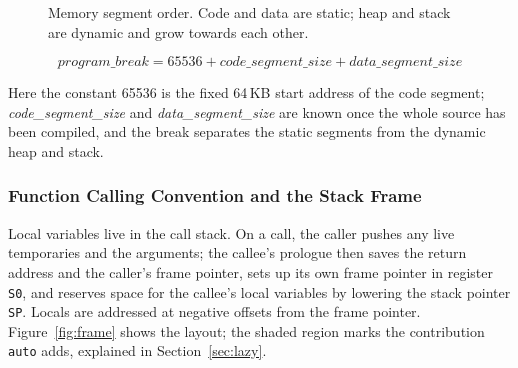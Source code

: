 \documentclass[a4paper,11pt]{article}
\begin{document}
\begin{figure}[H]
\centering
{}
\caption{Memory segment order. Code and data are static; heap and stack are dynamic and grow towards each other.}
\label{fig:memory}
\end{figure}

\begin{equation}
\textit{program\_break} = 65536 + \textit{code\_segment\_size} + \textit{data\_segment\_size}
\label{eq:break}
\end{equation}

\noindent Here the constant 65536 is the fixed 64\,KB start address of the code segment; \textit{code\_segment\_size} and \textit{data\_segment\_size} are known once the whole source has been compiled, and the break separates the static segments from the dynamic heap and stack.

\subsubsection{Function Calling Convention and the Stack Frame}
\label{sec:frame}

Local variables live in the call stack. On a call, the caller pushes any live temporaries and the arguments; the callee's prologue then saves the return address and the caller's frame pointer, sets up its own frame pointer in register \texttt{S0}, and reserves space for the callee's local variables by lowering the stack pointer \texttt{SP}. Locals are addressed at negative offsets from the frame pointer. Figure~\ref{fig:frame} shows the layout; the shaded region marks the contribution \texttt{auto} adds, explained in Section~\ref{sec:lazy}.
\end{document}
